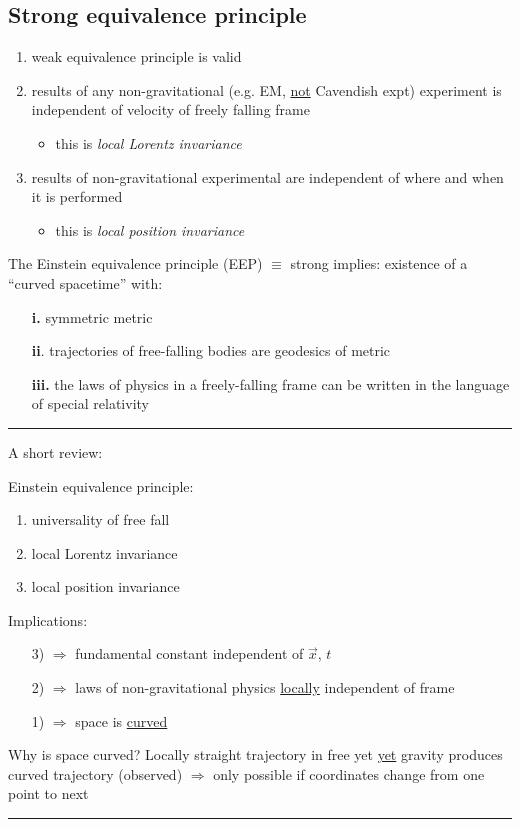 \documentclass[a4paper]{article} %
\newcommand{\review}[1]
{
\hrule
A short review:

#1
\hrule
}
\begin{document}
\subsection{Strong equivalence principle}
\begin{enumerate}
\item weak equivalence principle is valid
\item results of any non-gravitational (e.g. EM, \underline{not} Cavendish expt) experiment is independent of velocity of freely falling frame
\begin{itemize}
\item this is \emph{local Lorentz invariance}
\end{itemize}
\item results of non-gravitational experimental are independent of where and when it is performed
\begin{itemize}
\item this is \emph{local position invariance}
\end{itemize}
\end{enumerate}

The Einstein equivalence principle (EEP) $\equiv$ strong implies: existence of a ``curved spacetime'' with:
\begin{enumerate}
\item[\textbf{i.}] symmetric metric
\item[\textbf{ii}.] trajectories of free-falling bodies are geodesics of metric
\item[\textbf{iii.}] the laws of physics in a freely-falling frame can be written in the language of special relativity
\end{enumerate}


\review{
Einstein equivalence principle:
\begin{enumerate}
\item universality of free fall
\item local Lorentz invariance
\item local position invariance
\end{enumerate}
Implications:
\begin{enumerate}
\item[3)] $\Rightarrow$ fundamental constant independent of $\vec{x}$, $t$
\item[2)] $\Rightarrow$ laws of non-gravitational physics \underline{locally} independent of frame
\item[1)] $\Rightarrow$ space is \underline{curved}
\end{enumerate}

Why is space curved? Locally straight trajectory in free yet \underline{yet} gravity produces curved trajectory (observed) $\Rightarrow$ only possible if coordinates change from one point to next
}
\end{document}
